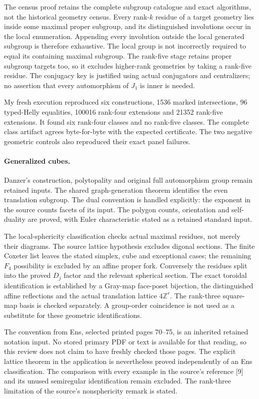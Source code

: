 \documentclass[11pt]{article}
\begin{document}
The census proof retains the complete subgroup catalogue and exact algorithms,
not the historical geometry census. Every rank-$k$ residue of a target geometry
lies inside some maximal proper subgroup, and its distinguished involutions
occur in the local enumeration. Appending every involution outside the local
generated subgroup is therefore exhaustive. The local group is not incorrectly
required to equal its containing maximal subgroup. The rank-five stage retains
proper subgroup targets too, so it excludes higher-rank geometries by taking a
rank-five residue. The conjugacy key is justified using actual conjugators and
centralizers; no assertion that every automorphism of $J_1$ is inner is needed.

My fresh execution reproduced six constructions, 1536 marked intersections,
96 typed-Helly equalities, 100016 rank-four extensions and 21352 rank-five
extensions. It found six rank-four classes and no rank-five classes. The complete
class artifact agrees byte-for-byte with the expected certificate. The two
negative geometric controls also reproduced their exact panel failures.

\paragraph{Generalized cubes.}
Danzer's construction, polytopality and original full automorphism group remain
retained inputs. The shared graph-generation theorem identifies the even
translation subgroup. The dual convention is handled explicitly: the exponent
in the source counts facets of its input. The polygon counts, orientation and
self-duality are proved, with Euler characteristic stated as a retained standard
input.

The local-sphericity classification checks actual maximal residues, not merely
their diagrams. The source lattice hypothesis excludes digonal sections. The
finite Coxeter list leaves the stated simplex, cube and exceptional cases;
the remaining $F_4$ possibility is excluded by an affine proper fork. Conversely
the residues split into the proved $D_j$ factor and the relevant spherical
section. The exact toroidal identification is established by a Gray-map
face-poset bijection, the distinguished affine reflections and the actual
translation lattice $4\mathbb Z^r$. The rank-three square-map basis is checked
separately. A group-order coincidence is not used as a substitute for these
geometric identifications.

The convention from Ens, selected printed pages 70--75, is an inherited retained
notation input. No stored primary PDF or text is available for that reading,
so this review does not claim to have freshly checked those pages. The explicit
lattice theorem in the application is nevertheless proved independently of an
Ens classification. The comparison with every example in the source's
reference [9] and its unused semiregular identification remain excluded.
The rank-three limitation of the source's nonsphericity remark is stated.
\end{document}

